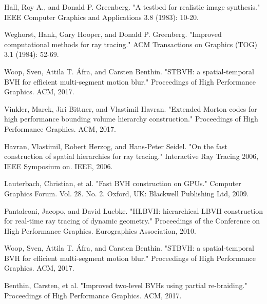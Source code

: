 \documentclass[11pt]{article}
\begin{document}
\begin{thebibliography}{3}
 Hall, Roy A., and Donald P. Greenberg. "A testbed for realistic image synthesis." IEEE Computer Graphics and Applications 3.8 (1983): 10-20.

Weghorst, Hank, Gary Hooper, and Donald P. Greenberg. "Improved computational methods for ray tracing." ACM Transactions on Graphics (TOG) 3.1 (1984): 52-69.



 Woop, Sven, Attila T. Áfra, and Carsten Benthin. "STBVH: a spatial-temporal BVH for efficient multi-segment motion blur." Proceedings of High Performance Graphics. ACM, 2017.

 Vinkler, Marek, Jiri Bittner, and Vlastimil Havran. "Extended Morton codes for high performance bounding volume hierarchy construction." Proceedings of High Performance Graphics. ACM, 2017.

 Havran, Vlastimil, Robert Herzog, and Hans-Peter Seidel. "On the fast construction of spatial hierarchies for ray tracing." Interactive Ray Tracing 2006, IEEE Symposium on. IEEE, 2006.

 Lauterbach, Christian, et al. "Fast BVH construction on GPUs." Computer Graphics Forum. Vol. 28. No. 2. Oxford, UK: Blackwell Publishing Ltd, 2009.

 Pantaleoni, Jacopo, and David Luebke. "HLBVH: hierarchical LBVH construction for real-time ray tracing of dynamic geometry." Proceedings of the Conference on High Performance Graphics. Eurographics Association, 2010.

 Woop, Sven, Attila T. Áfra, and Carsten Benthin. "STBVH: a spatial-temporal BVH for efficient multi-segment motion blur." Proceedings of High Performance Graphics. ACM, 2017.

 Benthin, Carsten, et al. "Improved two-level BVHs using partial re-braiding." Proceedings of High Performance Graphics. ACM, 2017.



\end{thebibliography}
\end{document}
